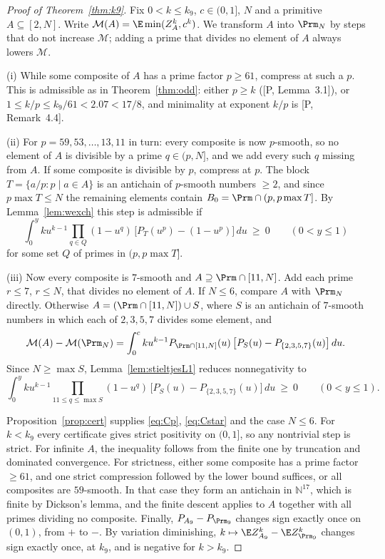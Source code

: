 \begin{proof}[Proof of Theorem~\ref{thm:k9}]
Fix $0<k\le k_9$, $c\in(0,1]$, $N$ and a primitive $A\subseteq[2,N]$. Write
$\mathcal M(A)=\E\min(Z_A^k,c^k)$. We transform $A$ into $\Prm_N$ by steps that do not increase
$\mathcal M$; adding a prime that divides no element of $A$ always lowers $\mathcal M$.

(i) While some composite of $A$ has a prime factor $p\ge61$, compress at such a $p$. This is
admissible as in Theorem~\ref{thm:odd}: either $p\ge k$ ([P, Lemma~3.1]), or
$1\le k/p\le k_9/61<2.07<17/8$, and minimality at exponent $k/p$ is [P, Remark~4.4].

(ii) For $p=59,53,\dots,13,11$ in turn: every composite is now $p$-smooth, so no element of $A$
is divisible by a prime $q\in(p,N]$, and we add every such $q$ missing from $A$. If some
composite is divisible by $p$, compress at $p$. The block $T=\{a/p:p\mid a\in A\}$ is an antichain
of $p$-smooth numbers $\ge2$, and since $p\max T\le N$ the remaining elements contain
$B_0=\Prm\cap(p,p\max T]$. By Lemma~\ref{lem:wexch} this step is admissible if
\begin{equation}\label{eq:Cp}
\int_0^yku^{k-1}\prod_{q\in Q}(1-u^q)\,\bigl[P_T(u^p)-(1-u^p)\bigr]\,du\ \ge\ 0\qquad(0<y\le1)
\end{equation}
for some set $Q$ of primes in $(p,p\max T]$.

(iii) Now every composite is $7$-smooth and $A\supseteq\Prm\cap[11,N]$. Add each prime $r\le7$,
$r\le N$, that divides no element of $A$. If $N\le6$, compare $A$ with $\Prm_N$ directly.
Otherwise $A=(\Prm\cap[11,N])\cup S$, where $S$ is an antichain of $7$-smooth numbers in which
each of $2,3,5,7$ divides some element, and
\[
\mathcal M(A)-\mathcal M(\Prm_N)=\int_0^cku^{k-1}P_{\Prm\cap[11,N]}(u)\,
\bigl[P_S(u)-P_{\{2,3,5,7\}}(u)\bigr]\,du .
\]
Since $N\ge\max S$, Lemma~\ref{lem:stieltjesL1} reduces nonnegativity to
\begin{equation}\label{eq:Cstar}
\int_0^yku^{k-1}\prod_{11\le q\le\max S}(1-u^q)\,\bigl[P_S(u)-P_{\{2,3,5,7\}}(u)\bigr]\,du\ \ge\ 0
\qquad(0<y\le1).
\end{equation}

Proposition~\ref{prop:cert} supplies \eqref{eq:Cp}, \eqref{eq:Cstar} and the case $N\le6$. For
$k<k_9$ every certificate gives strict positivity on $(0,1]$, so any nontrivial step is strict.
For infinite $A$, the inequality follows from the finite one by truncation and dominated
convergence. For strictness, either some composite has a prime factor $\ge61$, and one strict
compression followed by the lower bound suffices, or all composites are $59$-smooth. In that case
they form an antichain in $\mathbb N^{17}$, which is finite by Dickson's lemma, and the finite
descent applies to $A$ together with all primes dividing no composite. Finally,
$P_{A_9}-P_{\Prm_9}$ changes sign exactly once on $(0,1)$, from $+$ to $-$. By variation
diminishing, $k\mapsto\E Z_{A_9}^k-\E Z_{\Prm_9}^k$ changes sign exactly once, at $k_9$, and is
negative for $k>k_9$.
\end{proof}

